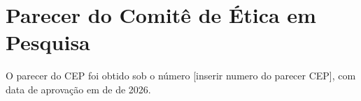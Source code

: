 \documentclass[12pt,a4paper,twoside,openright]{book}
\newcommand{\anodefesa}{2026}
\newcommand{\numeroparecer}{[inserir numero do parecer CEP]}
\begin{document}
\section{Parecer do Comitê de Ética em Pesquisa}
\label{sec:parecer_cep}

O parecer do CEP foi obtido sob o número \numeroparecer{}, com data de aprovação em \underline{\hspace{2cm}} de \underline{\hspace{2cm}} de \anodefesa{}.

\backmatter
\end{document}
